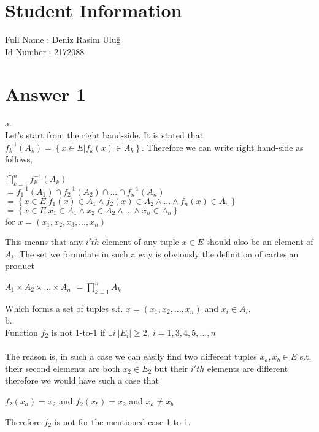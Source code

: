 \documentclass[12pt]{article}
\begin{document}
\section*{Student Information } 
Full Name : Deniz Rasim Uluğ \\
Id Number : 2172088 \\

\section*{Answer 1}
a.\\
Let's start from the right hand-side. It is stated that $f_k^{-1}(A_k)=\left\{{x\in E| f_k(x)\in A_k}\right\}$. Therefore we can write right hand-side as follows,
\begin{center}
$\bigcap\limits_{k=1}^n f_k^{-1}(A_k)$\\
$=f^{-1}_1(A_1) \cap f^{-1}_2(A_2)\cap ...\cap f^{-1}_n(A_n)$\\
$=\left\{{x\in E|f_1(x)\in A_1\wedge f_2(x)\in A_2\wedge ...\wedge f_n(x)\in A_n}\right\}$\\
$=\left\{{x\in E|x_1\in A_1\wedge x_2\in A_2\wedge ...\wedge x_n\in A_n}\right\}$\\
for $x=(x_1,x_2,x_3,...,x_n)$
\end{center}
This means that any $i'th$ element of any tuple $x\in E$ should also be an element of $A_i$. The set we formulate in such a way is obviously the definition of cartesian product
\begin{center}
$A_1\times A_2\times ...\times A_n$
$=\prod\limits_{k=1}^n A_k$
\end{center}
Which forms a set of tuples s.t. $x=(x_1,x_2,...,x_n)$ and $x_i\in A_i$.\\
b.\\
Function $f_2$ is not 1-to-1 if $\exists i\: |E_i|\geq 2,\: i=1,3,4,5,...,n$\\\\
The reason is, in such a case we can easily find two different tuples $x_a,x_b\in E$ s.t. their second elements are both $x_2\in E_2$ but their $i'th$ elements are different therefore we would have such a case that
\begin{center}
$f_2(x_a)=x_2$ and $f_2(x_b)=x_2$ and $ x_a\neq x_b$
\end{center}
Therefore $f_2$ is not for the mentioned case 1-to-1.\\
\end{document}
